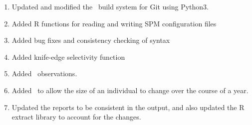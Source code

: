 \begin{enumerate}
  \item Updated and modified the \SPM\ build system for Git using Python3.
  \item Added R functions for reading and writing SPM configuration files
	\item Added bug fixes and consistency checking of syntax
	\item Added knife-edge selectivity function
  \item Added\  observations.
  \item Added\  to allow the size of an individual to change over the course of a year.	
  \item Updated the reports to be consistent in the output, and also updated the R extract library to account for the changes.
\end{enumerate}


